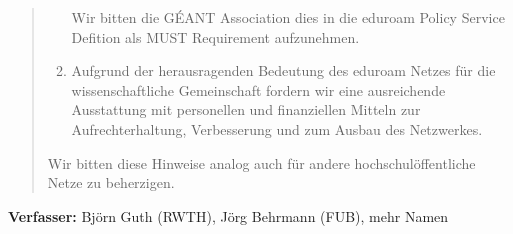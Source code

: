 \documentclass[12pt,oneside]{scrartcl}
\begin{document}
\begin{quote}
\begin{enumerate}
    Wir bitten die GÉANT Association dies in die eduroam Policy Service Defition
    als MUST Requirement aufzunehmen.

  \item Aufgrund der herausragenden Bedeutung des eduroam Netzes für die
    wissenschaftliche Gemeinschaft fordern wir eine ausreichende Ausstattung mit
    personellen und finanziellen Mitteln zur Aufrechterhaltung, Verbesserung und
    zum Ausbau des Netzwerkes.
  \end{enumerate}

  Wir bitten diese Hinweise analog auch für andere hochschulöffentliche Netze zu
  beherzigen.

\end{quote}

\vspace{1cm}
\textbf{Verfasser:} Björn Guth (RWTH), Jörg Behrmann (FUB), mehr Namen
\end{document}
